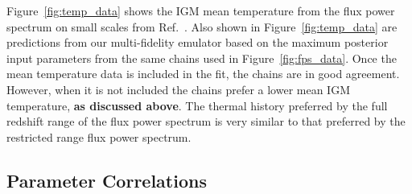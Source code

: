 Figure~\ref{fig:temp_data} shows the IGM mean temperature from the flux power spectrum on small scales from Ref.~\cite{2021MNRAS.506.4389G}.
Also shown in Figure~\ref{fig:temp_data} are predictions from our multi-fidelity emulator based on the maximum posterior input parameters from the same chains used in Figure~\ref{fig:fps_data}.
Once the mean temperature data is included in the fit, the chains are in good agreement.
However, when it is not included the chains prefer a lower mean IGM temperature, \textbf{as discussed above}.
The thermal history preferred by the full redshift range of the flux power spectrum is very similar to that preferred by the restricted range flux power spectrum. 

\subsection{Parameter Correlations}
\label{sec:correlations}

